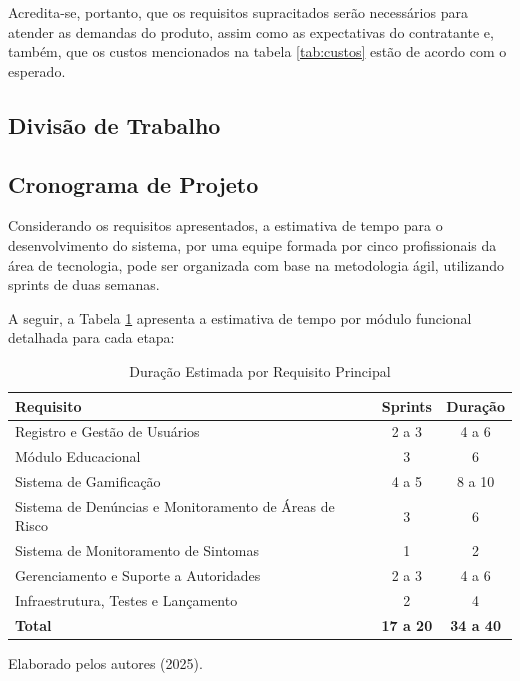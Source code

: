 \documentclass[a4paper, 12pt]{article}
\begin{document}
Acredita-se, portanto, que os requisitos supracitados serão necessários para atender as demandas do produto, assim como as expectativas do contratante e, também, que os custos mencionados na tabela \ref{tab:custos} estão de acordo com o esperado.

\newpage

\subsection{Divisão de Trabalho}


\subsection{Cronograma de Projeto}

Considerando os requisitos apresentados, a estimativa de tempo para o desenvolvimento do sistema, por uma equipe formada por cinco profissionais da área de tecnologia, pode ser organizada com base na metodologia ágil, utilizando sprints de duas semanas.

A seguir, a Tabela \ref{tab:cronograma}  apresenta a estimativa de tempo por módulo funcional detalhada para cada etapa:

\begin{table}[h]
\centering
\caption{Duração Estimada por Requisito Principal}
\label{tab:cronograma}
\begin{tabular}{|l|c|c|}
\hline
\textbf{Requisito} & \textbf{Sprints} & \textbf{Duração} \\
\hline
Registro e Gestão de Usuários & 2 a 3 & 4 a 6 \\
Módulo Educacional & 3  & 6 \\
Sistema de Gamificação & 4 a 5  & 8 a 10 \\
Sistema de Denúncias e Monitoramento de Áreas de Risco & 3  & 6  \\
Sistema de Monitoramento de Sintomas & 1  & 2  \\
Gerenciamento e Suporte a Autoridades & 2 a 3  & 4 a 6  \\
Infraestrutura, Testes e Lançamento & 2  & 4 \\
\hline
\textbf{Total} & \textbf{17 a 20} & \textbf{34 a 40} \\
\hline
\end{tabular}

\smallskip
Elaborado pelos autores (2025).
\end{table}
\end{document}
